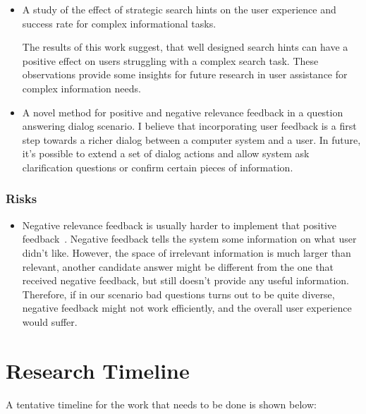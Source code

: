 \begin{itemize}
\item A study of the effect of strategic search hints on the user experience and success rate for complex informational tasks.

The results of this work suggest, that well designed search hints can have a positive effect on users struggling with a complex search task.
These observations provide some insights for future research in user assistance for complex information needs.

\item A novel method for positive and negative relevance feedback in a question answering dialog scenario. 
I believe that incorporating user feedback is a first step towards a richer dialog between a computer system and a user.
In future, it's possible to extend a set of dialog actions and allow system ask clarification questions or confirm certain pieces of information.
\end{itemize}

\subsubsection{Risks}
\label{section:proposal:plan:users:risks}

\begin{itemize}
\item Negative relevance feedback is usually harder to implement that positive feedback~\cite{wang2008study}.
Negative feedback tells the system some information on what user didn't like.
However, the space of irrelevant information is much larger than relevant, \ie another candidate answer might be different from the one that received negative feedback, but still doesn't provide any useful information.
Therefore, if in our scenario bad questions turns out to be quite diverse, negative feedback might not work efficiently, and the overall user experience would suffer.
\end{itemize}

\section{Research Timeline}
\label{section:proposal:timeline}

A tentative timeline for the work that needs to be done is shown below:

